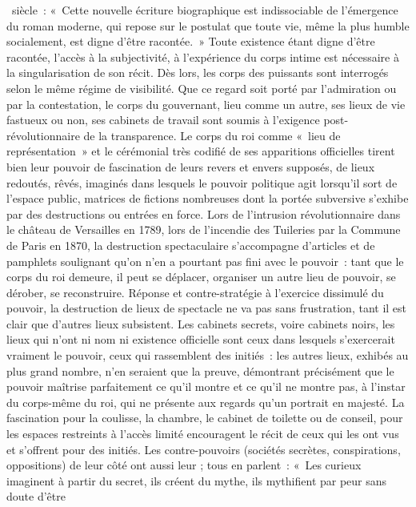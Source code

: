 \documentclass[11pt,twoside,openany]{book}
\newenvironment{lateiDocument}{}{}
\begin{document}
\begin{lateiDocument}
\begin{teiElement}[name={TEI},change={commons\_edition}]
\begin{teiElement}[name={text},type={book},xmlid={book}]
\begin{teiElement}[name={group},type={book},xmlid={book-001}]
\begin{teiElement}
\begin{teiElement}[name={body},xmlid={body-001}]
 siècle : « Cette nouvelle écriture biographique est indissociable de l’émergence du roman moderne, qui repose sur le postulat que toute vie, même la plus humble socialement, est digne d’être racontée. » Toute existence étant digne d’être racontée, l’accès à la subjectivité, à l’expérience du corps intime est nécessaire à la singularisation de son récit. Dès lors, les corps des puissants sont interrogés selon le même régime de visibilité. Que ce regard soit porté par l’admiration ou par la contestation, le corps du gouvernant, lieu comme un autre, ses lieux de vie fastueux ou non, ses cabinets de travail sont soumis à l’exigence post-révolutionnaire de la transparence. Le corps du roi comme « lieu de représentation » et le cérémonial très codifié de ses apparitions officielles tirent bien leur pouvoir de fascination de leurs revers et envers supposés, de lieux redoutés, rêvés, imaginés dans lesquels le pouvoir politique agit lorsqu’il sort de l’espace public, matrices de fictions nombreuses dont la portée subversive s’exhibe par des destructions ou entrées en force. Lors de l’intrusion révolutionnaire dans le château de Versailles en 1789, lors de l’incendie des Tuileries par la Commune de Paris en 1870, la destruction spectaculaire s’accompagne d’articles et de pamphlets soulignant qu’on n’en a pourtant pas fini avec le pouvoir : tant que le corps du roi demeure, il peut se déplacer, organiser un autre lieu de pouvoir, se dérober, se reconstruire. Réponse et contre-stratégie à l’exercice dissimulé du pouvoir, la destruction de lieux de spectacle ne va pas sans frustration, tant il est clair que d’autres lieux subsistent. Les cabinets secrets, voire cabinets noirs, les lieux qui n’ont ni nom ni existence officielle sont ceux dans lesquels s’exercerait vraiment le pouvoir, ceux qui rassemblent des initiés : les autres lieux, exhibés au plus grand nombre, n’en seraient que la preuve, démontrant précisément que le pouvoir maîtrise parfaitement ce qu’il montre et ce qu’il ne montre pas, à l’instar du corps-même du roi, qui ne présente aux regards qu’un portrait en majesté. La fascination pour la coulisse, la chambre, le cabinet de toilette ou de conseil, pour les espaces restreints à l’accès limité encouragent le récit de ceux qui les ont vus et s’offrent pour des initiés. Les contre-pouvoirs (sociétés secrètes, conspirations, oppositions) de leur côté ont aussi leur ; tous en parlent : « Les curieux imaginent à partir du secret, ils créent du mythe, ils mythifient par peur sans doute d’être 
\end{teiElement}
\end{teiElement}
\end{teiElement}
\end{teiElement}
\end{teiElement}
\end{lateiDocument}
\end{document}
